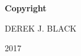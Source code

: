 
\newpage

\thispagestyle{empty}

\vspace*{0.9cm}

\begin{center}

{\bf \Huge Copyright}

\vspace{1cm}


   \Large DEREK J. BLACK\\

   \vspace{0.5cm}


   2017\\

   \vspace{0.5cm}

\end{center}
